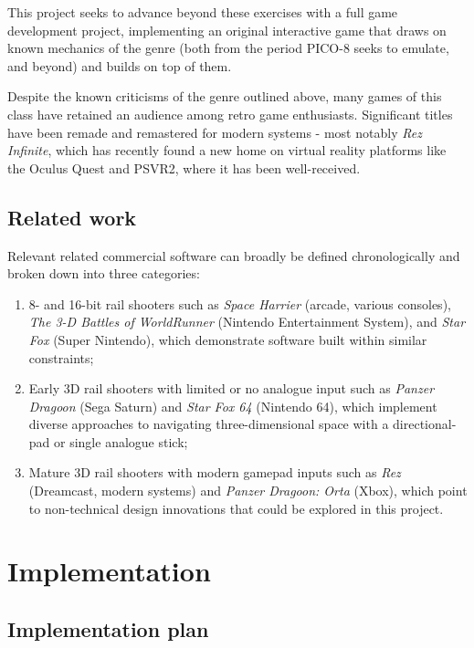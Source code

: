 \documentclass{article}
\begin{document}
This project seeks to advance beyond these exercises with a full game development project, implementing
an original interactive game that draws on known mechanics of the genre (both from the period PICO-8 seeks
to emulate, and beyond) and builds on top of them.

Despite the known criticisms of the genre outlined above, many games of this
class have retained an audience among retro game enthusiasts. Significant titles have been
remade and remastered for modern systems - most notably \textit{Rez Infinite}, which has
recently found a new home on virtual reality platforms like the Oculus Quest and PSVR2,
where it has been well-received.

\subsection*{Related work}
Relevant related commercial software can broadly be defined
chronologically and broken down into three categories:

\begin{enumerate}
    \item 8- and 16-bit rail shooters such as 
    \textit{Space Harrier} (arcade, various consoles),
    \textit{The 3-D Battles of WorldRunner} (Nintendo Entertainment System), and 
    \textit{Star Fox} (Super Nintendo),
    which demonstrate software built within similar constraints;
    
    \item Early 3D rail shooters with limited or no analogue input such as 
    \textit{Panzer Dragoon} (Sega Saturn) and
    \textit{Star Fox 64} (Nintendo 64),
    which implement diverse approaches to navigating three-dimensional space with a directional-pad or
    single analogue stick;
    
    \item Mature 3D rail shooters with modern gamepad inputs such as 
    \textit{Rez} (Dreamcast, modern systems) and
    \textit{Panzer Dragoon: Orta} (Xbox),
    which point to non-technical design innovations that could be explored in this project.
\end{enumerate}


\section{Implementation}
\subsection*{Implementation plan}
\end{document}
